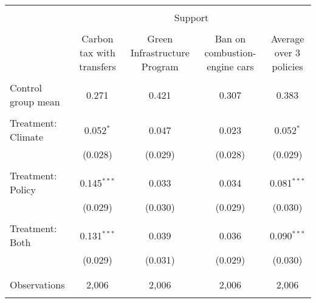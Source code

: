 
\begin{tabular}{@{\extracolsep{5pt}}lcccc} 
\\[-1.8ex]\hline 
\hline \\[-1.8ex] 
 & \multicolumn{4}{c}{Support} \\ 
\cline{2-5} 
\\[-1.8ex] & Carbon tax with transfers & Green Infrastructure Program & Ban on combustion-engine cars & Average over 3 policies \\ 
\hline \\[-1.8ex] 
 Control group mean & 0.271 & 0.421 & 0.307 & 0.383  \\ \hline \\[-1.8ex] Treatment: Climate & 0.052$^{*}$ & 0.047 & 0.023 & 0.052$^{*}$ \\ 
  & (0.028) & (0.029) & (0.028) & (0.029) \\ 
  & & & & \\ 
 Treatment: Policy & 0.145$^{***}$ & 0.033 & 0.034 & 0.081$^{***}$ \\ 
  & (0.029) & (0.030) & (0.029) & (0.030) \\ 
  & & & & \\ 
 Treatment: Both & 0.131$^{***}$ & 0.039 & 0.036 & 0.090$^{***}$ \\ 
  & (0.029) & (0.031) & (0.029) & (0.030) \\ 
  & & & & \\ 
\hline \\[-1.8ex] 

Observations & 2,006 & 2,006 & 2,006 & 2,006 \\ 
\hline 
\hline \\[-1.8ex] 
\end{tabular} 